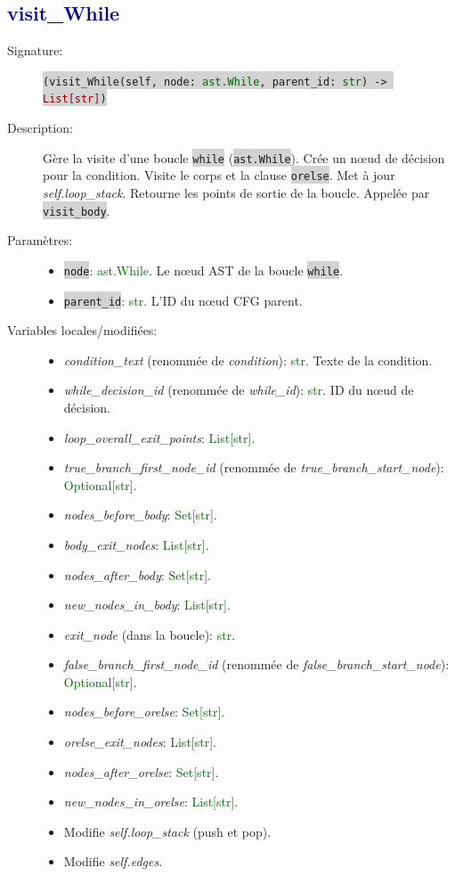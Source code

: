 \documentclass[11pt,a4paper]{article}
\newcommand{\code}[1]{\colorbox{lightgray}{\texttt{\small #1}}}
\newcommand{\var}[1]{\textit{#1}}
\newcommand{\vartype}[1]{\textcolor{darkgreen}{#1}}
\newcommand{\methodname}[1]{\textbf{\textcolor{darkblue}{#1}}}
\newcommand{\param}[1]{\code{#1}}
\newcommand{\rettype}[1]{\textcolor{darkred}{#1}}
\begin{document}
\subsection*{\methodname{visit\_While}}
\begin{description}
    \item[Signature:] \code{(visit\_While(self, node: \vartype{ast.While}, parent\_id: \vartype{str}) -> \rettype{List[str]})}
    \item[Description:] Gère la visite d'une boucle \code{while} (\code{ast.While}). Crée un nœud de décision pour la condition. Visite le corps et la clause \code{orelse}. Met à jour \var{self.loop\_stack}. Retourne les points de sortie de la boucle. Appelée par \code{visit\_body}.
    \item[Paramètres:]
    \begin{itemize}
        \item \param{node}: \vartype{ast.While}. Le nœud AST de la boucle \code{while}.
        \item \param{parent\_id}: \vartype{str}. L'ID du nœud CFG parent.
    \end{itemize}
    \item[Variables locales/modifiées:]
    \begin{itemize}
        \item \var{condition\_text} (renommée de \var{condition}): \vartype{str}. Texte de la condition.
        \item \var{while\_decision\_id} (renommée de \var{while\_id}): \vartype{str}. ID du nœud de décision.
        \item \var{loop\_overall\_exit\_points}: \vartype{List[str]}.
        \item \var{true\_branch\_first\_node\_id} (renommée de \var{true\_branch\_start\_node}): \vartype{Optional[str]}.
        \item \var{nodes\_before\_body}: \vartype{Set[str]}.
        \item \var{body\_exit\_nodes}: \vartype{List[str]}.
        \item \var{nodes\_after\_body}: \vartype{Set[str]}.
        \item \var{new\_nodes\_in\_body}: \vartype{List[str]}.
        \item \var{exit\_node} (dans la boucle): \vartype{str}.
        \item \var{false\_branch\_first\_node\_id} (renommée de \var{false\_branch\_start\_node}): \vartype{Optional[str]}.
        \item \var{nodes\_before\_orelse}: \vartype{Set[str]}.
        \item \var{orelse\_exit\_nodes}: \vartype{List[str]}.
        \item \var{nodes\_after\_orelse}: \vartype{Set[str]}.
        \item \var{new\_nodes\_in\_orelse}: \vartype{List[str]}.
        \item Modifie \var{self.loop\_stack} (push et pop).
        \item Modifie \var{self.edges}.
    \end{itemize}
\end{description}
\end{document}
